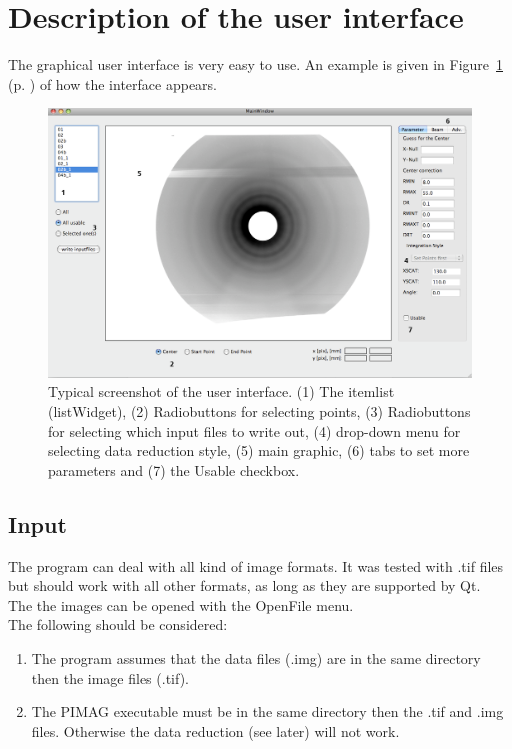 \section{Description of the user interface}\label{interface} 
The graphical user interface is very easy to use. An example is given in Figure~\ref{ui} (p. \pageref{ui}) of how the interface appears. 

\begin{figure}
\includegraphics[width=20cm, angle=90]{ui.png}
\caption{Typical screenshot of the user interface. (1) The itemlist (listWidget), (2) Radiobuttons for selecting points, (3) Radiobuttons for selecting which input files to write out, (4) drop-down menu for selecting data reduction style, (5) main graphic, (6) tabs to set more parameters and (7) the Usable checkbox. }
\label{ui} 
\end{figure} 

\subsection{Input}
The program can deal with all kind of image formats. It was tested with .tif files but should work with all other formats, as long as they are supported by Qt. \\
The the images can be opened with the OpenFile menu. \\
The following should be considered:
\begin{enumerate}
\item The program assumes that the data files (.img) are in the same directory then the image files (.tif). 
\item The PIMAG executable must be in the same directory then the .tif and .img files. Otherwise the data reduction (see later) will not work. 
\end{enumerate}

